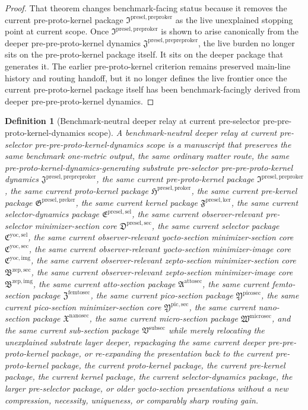 \documentclass[11pt]{article}
\newcommand{\PrePreProtoKernelPackage}{\mathfrak J^{\mathrm{presel,prepreproker}}}
\newcommand{\PreProtoKernelPackage}{\mathfrak I^{\mathrm{presel,preproker}}}
\newcommand{\ProtoKernelPackage}{\mathfrak H^{\mathrm{presel,proker}}}
\newcommand{\PreKernelPackage}{\mathfrak G^{\mathrm{presel,preker}}}
\newcommand{\KernelPackage}{\mathfrak F^{\mathrm{presel,ker}}}
\newcommand{\PreSectionSelectorPackage}{\mathfrak E^{\mathrm{presel,sel}}}
\newcommand{\PreSelectorMinSectionCore}{\mathfrak D^{\mathrm{presel,sec}}}
\newcommand{\YoctoSelectorPackage}{\mathfrak C^{\mathrm{yoc,sel}}}
\newcommand{\YoctoImageCore}{\mathfrak C^{\mathrm{yoc,img}}}
\newcommand{\YoctoMinSectionCore}{\mathfrak C^{\mathrm{yoc,sec}}}
\newcommand{\ZeptoImageCore}{\mathfrak B^{\mathrm{zep,img}}}
\newcommand{\ZeptoMinSectionCore}{\mathfrak B^{\mathrm{zep,sec}}}
\newcommand{\AttoSectionPackage}{\mathfrak A^{\mathrm{attosec}}}
\newcommand{\FemtoSectionPackage}{\mathfrak Z^{\mathrm{femtosec}}}
\newcommand{\PicoSectionPackage}{\mathfrak Y^{\mathrm{picosec}}}
\newcommand{\PicoMinSectionCore}{\mathfrak Y^{\mathrm{pic,sec}}}
\newcommand{\NanoSectionPackage}{\mathfrak X^{\mathrm{nanosec}}}
\newcommand{\MicroSectionPackage}{\mathfrak W^{\mathrm{microsec}}}
\newcommand{\SubSectionPackage}{\mathfrak V^{\mathrm{subsec}}}
\newtheorem{definition}{Definition}
\begin{document}
\begin{proof}
That theorem changes benchmark-facing status because it removes the current pre-proto-kernel package \(\PreProtoKernelPackage\) as the live unexplained stopping point at current scope. Once \(\PreProtoKernelPackage\) is shown to arise canonically from the deeper pre-pre-proto-kernel dynamics \(\PrePreProtoKernelPackage\), the live burden no longer sits on the pre-proto-kernel package itself. It sits on the deeper package that generates it. The earlier pre-proto-kernel criterion remains preserved main-line history and routing handoff, but it no longer defines the live frontier once the current pre-proto-kernel package itself has been benchmark-facingly derived from deeper pre-pre-proto-kernel dynamics.
\end{proof}

\begin{definition}[Benchmark-neutral deeper relay at current pre-selector pre-pre-proto-kernel-dynamics scope]
A \emph{benchmark-neutral deeper relay at current pre-selector pre-pre-proto-kernel-dynamics scope} is a manuscript that preserves the same benchmark one-metric output, the same ordinary matter route, the same pre-proto-kernel-dynamics-generating substrate pre-selector pre-pre-proto-kernel dynamics \(\PrePreProtoKernelPackage\), the same current pre-proto-kernel package \(\PreProtoKernelPackage\), the same current proto-kernel package \(\ProtoKernelPackage\), the same current pre-kernel package \(\PreKernelPackage\), the same current kernel package \(\KernelPackage\), the same current selector-dynamics package \(\PreSectionSelectorPackage\), the same current observer-relevant pre-selector minimizer-section core \(\PreSelectorMinSectionCore\), the same current selector package \(\YoctoSelectorPackage\), the same current observer-relevant yocto-section minimizer-section core \(\YoctoMinSectionCore\), the same current observer-relevant yocto-section minimizer-image core \(\YoctoImageCore\), the same current observer-relevant zepto-section minimizer-section core \(\ZeptoMinSectionCore\), the same current observer-relevant zepto-section minimizer-image core \(\ZeptoImageCore\), the same current atto-section package \(\AttoSectionPackage\), the same current femto-section package \(\FemtoSectionPackage\), the same current pico-section package \(\PicoSectionPackage\), the same current pico-section minimizer-section core \(\PicoMinSectionCore\), the same current nano-section package \(\NanoSectionPackage\), the same current micro-section package \(\MicroSectionPackage\), and the same current sub-section package \(\SubSectionPackage\) while merely relocating the unexplained substrate layer deeper, repackaging the same current deeper pre-pre-proto-kernel package, or re-expanding the presentation back to the current pre-proto-kernel package, the current proto-kernel package, the current pre-kernel package, the current kernel package, the current selector-dynamics package, the larger pre-selector package, or older yocto-section presentations without a new compression, necessity, uniqueness, or comparably sharp routing gain.
\end{definition}
\end{document}
